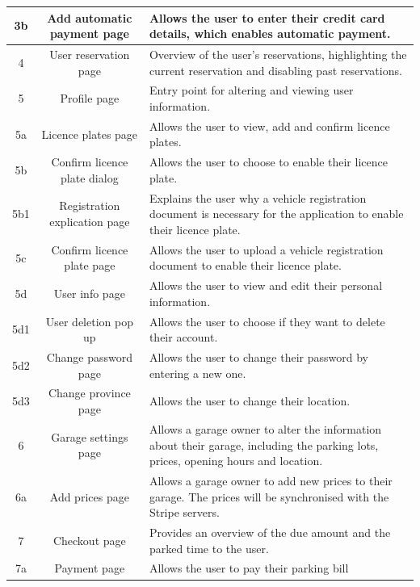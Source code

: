 \begin{appendices}
\begin{table}[hpt]
\begin{tabular}{|c|c|p{9cm}|}
         3b & Add automatic payment page& Allows the user to enter their credit card details, which enables automatic payment.\\
         \hline 
         \hline
         4 & User reservation page & Overview of the user's reservations, highlighting the current reservation and disabling past reservations.\\
         \hline 
         \hline
         5 & Profile page & Entry point for altering and viewing user information. \\
         \hline 
         5a & Licence plates page & Allows the user to view, add and confirm licence plates. \\
         \hline 
         5b & Confirm licence plate dialog& Allows the user to choose to enable their licence plate. \\
         \hline 
         5b1 & Registration explication page & Explains the user why a vehicle registration document is necessary for the application to enable their licence plate.\\
         \hline 
         5c & Confirm licence plate page & Allows the user to upload a vehicle registration document to enable their licence plate.\\
         \hline 
         5d & User info page & Allows the user to view and edit their personal information. \\
         \hline 
         5d1 & User deletion pop up & Allows the user to choose if they want to delete their account. \\
         \hline 
         5d2 & Change password page & Allows the user to change their password by entering a new one. \\
         \hline 
         5d3 & Change province page & Allows the user to change their location.\\
         \hline 
         \hline
         6 & Garage settings page & Allows a garage owner to alter the information about their garage, including the parking lots, prices, opening hours and location. \\
         \hline 
         6a & Add prices page & Allows a garage owner to add new prices to their garage. The prices will be synchronised with the Stripe servers.\\
         \hline 
         \hline
         7 & Checkout page & Provides an overview of the due amount and the parked time to the user.\\
         \hline 
         7a & Payment page & Allows the user to pay their parking bill \\

\end{tabular}
\end{table}
\end{appendices}
